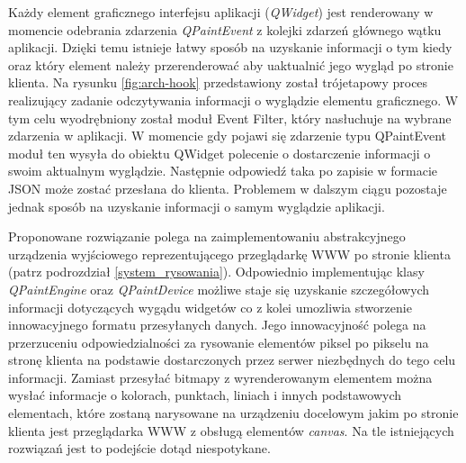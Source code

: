 
Każdy element graficznego interfejsu aplikacji (\emph{QWidget}) jest renderowany w momencie odebrania zdarzenia \emph{QPaintEvent} z kolejki zdarzeń głównego wątku aplikacji. Dzięki temu istnieje łatwy sposób na uzyskanie informacji o tym kiedy oraz który element należy przerenderować aby uaktualnić jego wygląd po stronie klienta. Na rysunku \ref{fig:arch-hook} przedstawiony został trójetapowy proces realizujący zadanie odczytywania informacji o wyglądzie elementu graficznego. 
W tym celu wyodrębniony został moduł Event Filter, który nasłuchuje na wybrane zdarzenia w aplikacji. W momencie gdy pojawi się zdarzenie typu QPaintEvent moduł ten wysyła do obiektu QWidget polecenie o dostarczenie informacji o swoim aktualnym wyglądzie. Następnie odpowiedź taka po zapisie w formacie JSON może zostać przesłana do klienta.  Problemem w dalszym ciągu pozostaje jednak sposób na uzyskanie informacji o samym wyglądzie aplikacji.

Proponowane rozwiązanie polega na zaimplementowaniu abstrakcyjnego urządzenia wyjściowego reprezentującego przeglądarkę WWW po stronie klienta (patrz podrozdział \ref{system_rysowania}). Odpowiednio implementując klasy \emph{QPaintEngine} oraz \emph{QPaintDevice} możliwe staje się uzyskanie szczegółowych informacji dotyczących wygądu widgetów co z kolei umozliwia stworzenie innowacyjnego formatu przesyłanych danych. Jego innowacyjność polega na przerzuceniu odpowiedzialności za rysowanie elementów piksel po pikselu na stronę klienta na podstawie dostarczonych przez serwer niezbędnych do tego celu informacji. Zamiast przesyłać bitmapy z wyrenderowanym elementem można wysłać informacje o kolorach, punktach, liniach i innych podstawowych elementach, które zostaną narysowane na urządzeniu docelowym jakim po stronie klienta jest przeglądarka WWW z obsługą elementów \emph{canvas}. Na tle istniejących rozwiązań jest to podejście dotąd niespotykane.
